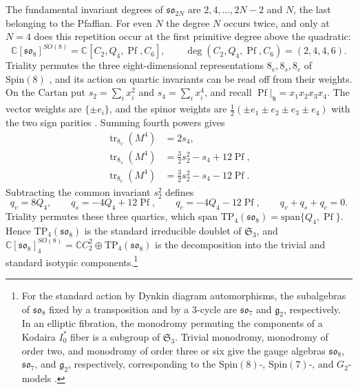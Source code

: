 \documentclass[10pt,reqno]{amsart}
\numberwithin{equation}{section}
\theoremstyle{plain}
\theoremstyle{definition}
\newcommand{\Sym}{\mathfrak{S}}
\DeclareMathOperator{\tr}{tr}
\DeclareMathOperator{\Pf}{Pf}
\newcommand{\TP}{\mathrm{TP}}
\begin{document}
The fundamental invariant degrees of $\mathfrak{so}_{2N}$ are $2,4,\dots,2N-2$ and $N$, the last belonging to the Pfaffian. For even $N$ the degree $N$ occurs twice, and only at $N=4$ does this repetition occur at the first primitive degree above the quadratic:
\begin{equation*}
	\mathbb{C}[\mathfrak{so}_8]^{SO(8)}=\mathbb{C}[C_2,Q_4,\Pf,C_6],\qquad \deg(C_2,Q_4,\Pf,C_6)=(2,4,4,6).
\end{equation*}
Triality permutes the three eight-dimensional representations $8_v,8_s,8_c$ of $\mathrm{Spin}(8)$ \cite{Esole:2017qeh,MW}, and its action on quartic invariants can be read off from their weights. On the Cartan put $s_2=\sum_ix_i^2$ and $s_4=\sum_ix_i^4$, and recall $\Pf|_\mathfrak{h}=x_1x_2x_3x_4$. The vector weights are $\{\pm e_i\}$, and the spinor weights are $\tfrac12(\pm e_1\pm e_2\pm e_3\pm e_4)$ with the two sign parities \cite{Esole:2017qeh}. Summing fourth powers gives
\begin{equation*}
\begin{aligned}
	\tr_{8_v}(M^4)&=2s_4,\\
	\tr_{8_s}(M^4)&=\tfrac32s_2^2-s_4+12\Pf,\\
	\tr_{8_c}(M^4)&=\tfrac32s_2^2-s_4-12\Pf .
\end{aligned}
\end{equation*}
Subtracting the common invariant $s_2^2$ defines
\begin{equation*}
	q_v=8Q_4,\qquad q_s=-4Q_4+12\Pf,\qquad q_c=-4Q_4-12\Pf,\qquad q_v+q_s+q_c=0 .
\end{equation*}
Triality permutes these three quartics, which span $\TP_4(\mathfrak{so}_8)=\mathrm{span}\{Q_4,\Pf\}$. Hence $\TP_4(\mathfrak{so}_8)$ is the standard irreducible doublet of $\Sym_3$, and $\mathbb{C}[\mathfrak{so}_8]^{SO(8)}_4=\mathbb{C} C_2^2\oplus\TP_4(\mathfrak{so}_8)$ is the decomposition into the trivial and standard isotypic components.\footnote{For the standard action by Dynkin diagram automorphisms, the subalgebras of $\mathfrak{so}_8$ fixed by a transposition and by a $3$-cycle are $\mathfrak{so}_7$ and $\mathfrak{g}_2$, respectively. In an elliptic fibration, the monodromy permuting the components of a Kodaira $I_0^*$ fiber is a subgroup of $\Sym_3$. Trivial monodromy, monodromy of order two, and monodromy of order three or six give the gauge algebras $\mathfrak{so}_8$, $\mathfrak{so}_7$, and $\mathfrak{g}_2$, respectively, corresponding to the $\mathrm{Spin}(8)$-, $\mathrm{Spin}(7)$-, and $G_2$-models \cite{Esole:2017qeh,Esole:2018mqb}.}
\end{document}
